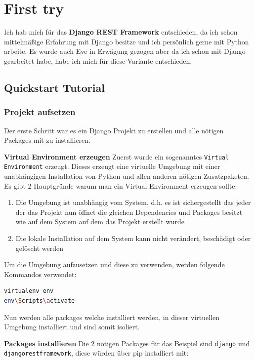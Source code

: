 
\section{First try}
Ich hab mich für das \textbf{Django REST Framework} entschieden, da ich schon mittelmäßige Erfahrung mit Django besitze und ich persönlich gerne mit Python arbeite. Es wurde auch Eve in Erwägung gezogen aber da ich schon mit Django gearbeitet habe, habe ich mich für diese Variante entschieden.

\subsection{Quickstart Tutorial}
\subsubsection{Projekt aufsetzen}
Der erste Schritt war es ein Django Projekt zu erstellen und alle nötigen Packages mit zu installieren.

\textbf{Virtual Environment erzeugen}
Zuerst wurde ein sogenanntes  \verb|Virtual Environment| erzeugt. Dieses erzeugt eine virtuelle Umgebung mit einer unabhängigen Installation von Python und allen anderen nötigen Zusatzpaketen.\\
Es gibt 2 Hauptgründe warum man ein Virtual Environment erzeugen sollte:
\begin{enumerate}
	\item Die Umgebung ist unabhängig vom System, d.h. es ist sichergestellt das jeder der das Projekt nun öffnet die gleichen Dependencies und Packages besitzt wie auf dem System auf dem das Projekt erstellt wurde
	\item Die lokale Installation auf dem System kann nicht verändert, beschädigt oder gelöscht werden
\end{enumerate}

Um die Umgebung aufzusetzen und diese zu verwenden, werden folgende Kommandos verwendet:

\begin{lstlisting}[language=bash]
virtualenv env
env\Scripts\activate
\end{lstlisting}

Nun werden alle packages welche installiert werden, in dieser virtuellen Umgebung installiert und sind somit isoliert.

\textbf{Packages installieren}
Die 2 nötigen Packages für das Beispiel sind \verb|django| und \verb|djangorestframework|, diese würden über pip installiert mit:

